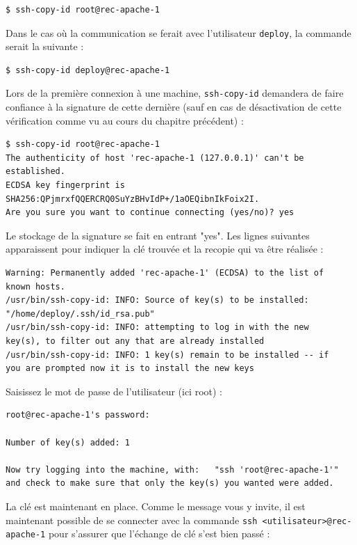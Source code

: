 \documentclass[hidelinks]{article}
\begin{document}
\begin{verbatim}
$ ssh-copy-id root@rec-apache-1
\end{verbatim}

Dans le cas où la communication se ferait avec l'utilisateur \texttt{deploy}, la commande serait la suivante :
\begin{verbatim}
$ ssh-copy-id deploy@rec-apache-1
\end{verbatim}

Lors de la première connexion à une machine, \texttt{ssh-copy-id} demandera de faire confiance à la signature de cette dernière (sauf en cas de désactivation de cette vérification comme vu au cours du chapitre précédent) :

\begin{verbatim}
$ ssh-copy-id root@rec-apache-1  
The authenticity of host 'rec-apache-1 (127.0.0.1)' can't be established. 
ECDSA key fingerprint is SHA256:QPjmrxfQQERCRQ0SuYzBHvIdP+/1aOEQibnIkFoix2I. 
Are you sure you want to continue connecting (yes/no)? yes  
\end{verbatim}


Le stockage de la signature se fait en entrant "yes". Les lignes suivantes apparaissent pour indiquer la clé trouvée et la recopie qui va être réalisée :

\begin{verbatim}
Warning: Permanently added 'rec-apache-1' (ECDSA) to the list of 
known hosts. 
/usr/bin/ssh-copy-id: INFO: Source of key(s) to be installed: 
"/home/deploy/.ssh/id_rsa.pub"  
/usr/bin/ssh-copy-id: INFO: attempting to log in with the new 
key(s), to filter out any that are already installed  
/usr/bin/ssh-copy-id: INFO: 1 key(s) remain to be installed -- if 
you are prompted now it is to install the new keys 
\end{verbatim}

Saisissez le mot de passe de l'utilisateur (ici root) :

\begin{verbatim}
root@rec-apache-1's password:   

Number of key(s) added: 1  
    
Now try logging into the machine, with:   "ssh 'root@rec-apache-1'" 
and check to make sure that only the key(s) you wanted were added.
\end{verbatim}

La clé est maintenant en place. Comme le message vous y invite, il est maintenant possible de se connecter avec la commande \texttt{ssh <utilisateur>@rec-apache-1} pour s'assurer que l'échange de clé s'est bien passé :
\end{document}
